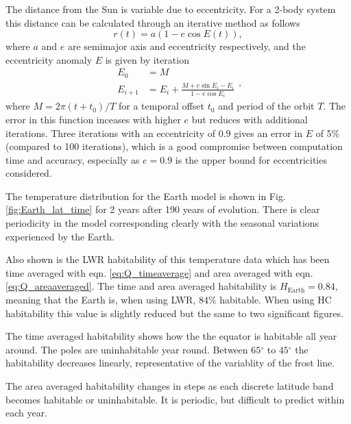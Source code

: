 \documentclass[12pt, onecolumn]{revtex4-2}    %
\newcommand{\degrees}{\ensuremath{^{\circ}}}
\begin{document}
The distance from the Sun is variable due to eccentricity.
For a 2-body system this distance can be calculated through an iterative method as follows
\begin{equation}
  r(t) = a (1 - e \cos E(t)), 
  \label{eq:two_body_distance}
\end{equation}
where $a$ and $e$ are semimajor axis and eccentricity respectively, and the eccentricity anomaly $E$ is given by iteration
\begin{equation}
  \begin{split}
    E_0 &= M \\
    E_{i+1} &= E_i + \frac{M + e \sin E_i - E_i}{1-e \cos E_i}
  \end{split},
  \label{eq:two_body_angle}
\end{equation}
where $M = 2\pi (t + t_0) / T$ for a temporal offset $t_0$ and period of the orbit $T$.
The error in this function inceases with higher $e$ but reduces with additional iterations.
Three iterations with an eccentricity of $0.9$ gives an error in $E$ of 5\% (compared to 100 iterations), which is a good compromise between computation time and accuracy, especially as $e=0.9$ is the upper bound for eccentricities considered.

The temperature distribution for the Earth model is shown in Fig. \ref{fig:Earth_lat_time} for 2 years after 190 years of evolution.
There is clear periodicity in the model corresponding clearly with the seasonal variations experienced by the Earth.


Also shown is the LWR habitability of this temperature data which has been time averaged with eqn. \eqref{eq:Q_timeaverage} and area averaged with eqn. \eqref{eq:Q_areaaveraged}.
The time and area averaged habitability is $H_\text{Earth} = 0.84$, meaning that the Earth is, when using LWR, $84\%$ habitable.
When using HC habitability this value is slightly reduced but the same to two significant figures.

The time averaged habitability shows how the the equator is habitable all year around.
The poles are uninhabitable year round.
Between $65\degrees$ to $45\degrees$ the habitability decreases linearly, representative of the variablity of the frost line.

The area averaged habitability changes in steps as each discrete latitude band becomes habitable or uninhabitable.
It is periodic, but difficult to predict within each year.
\end{document}
